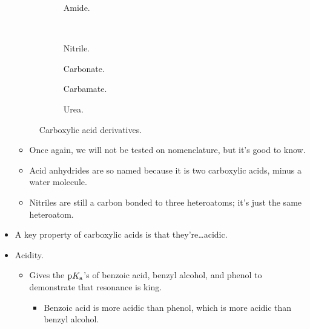 \documentclass[../notes.tex]{subfiles}
\begin{document}
\begin{itemize}
\begin{figure}[H]
\begin{subfigure}[b]{0.19\linewidth}
            \caption{Amide.}
            \label{fig:carboxylicAcidDerivativese}
        \end{subfigure}\\[2em]
        \begin{subfigure}[b]{0.22\linewidth}
            \centering
            \caption{Nitrile.}
            \label{fig:carboxylicAcidDerivativesf}
        \end{subfigure}
        \begin{subfigure}[b]{0.22\linewidth}
            \centering
            \caption{Carbonate.}
            \label{fig:carboxylicAcidDerivativesg}
        \end{subfigure}
        \begin{subfigure}[b]{0.22\linewidth}
            \centering
            \caption{Carbamate.}
            \label{fig:carboxylicAcidDerivativesh}
        \end{subfigure}
        \begin{subfigure}[b]{0.22\linewidth}
            \centering
            \caption{Urea.}
            \label{fig:carboxylicAcidDerivativesi}
        \end{subfigure}
        \caption{Carboxylic acid derivatives.}
        \label{fig:carboxylicAcidDerivatives}
    \end{figure}
    \begin{itemize}
        \item Once again, we will not be tested on nomenclature, but it's good to know.
        \item Acid anhydrides are so named because it is two carboxylic acids, minus a water molecule.
        \item Nitriles are still a carbon bonded to three heteroatoms; it's just the same heteroatom.
    \end{itemize}
    \item A key property of carboxylic acids is that they're\dots acidic.
    \item Acidity.
    \begin{itemize}
        \item Gives the $\text{p}K_\text{a}$'s of benzoic acid, benzyl alcohol, and phenol to demonstrate that resonance is king.
        \begin{itemize}
            \item Benzoic acid is more acidic than phenol, which is more acidic than benzyl alcohol.

\end{itemize}
\end{itemize}
\end{itemize}
\end{document}
